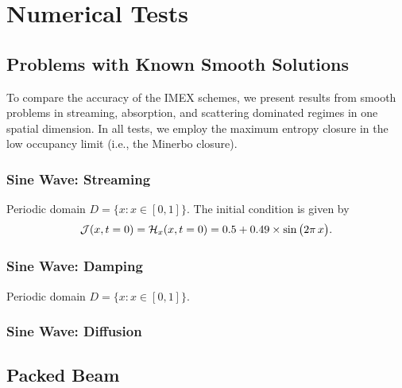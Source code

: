 \section{Numerical Tests}
\label{sec:numerical}

\subsection{Problems with Known Smooth Solutions}

To compare the accuracy of the IMEX schemes, we present results from smooth problems in streaming, absorption, and scattering dominated regimes in one spatial dimension.  
In all tests, we employ the maximum entropy closure in the low occupancy limit (i.e., the Minerbo closure).  

\subsubsection{Sine Wave: Streaming}

Periodic domain $D=\{x:x\in[0,1]\}$.  
The initial condition is given by
\begin{equation}
  \mathcal{J}(x,t=0)=\mathcal{H}_{x}(x,t=0)=0.5+0.49\times\sin\big(2\pi\,x\big).  
\end{equation}

\subsubsection{Sine Wave: Damping}

Periodic domain $D=\{x:x\in[0,1]\}$.  

\subsubsection{Sine Wave: Diffusion}

\subsection{Packed Beam}

